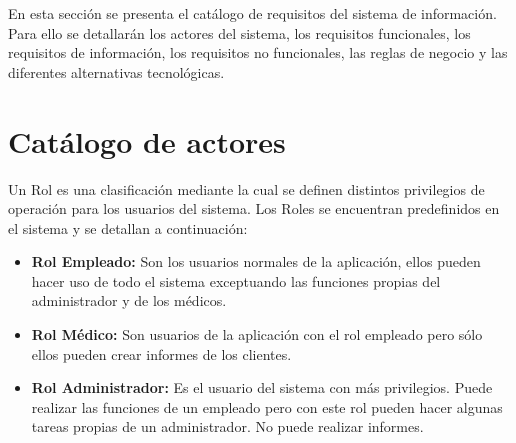 

En esta sección se presenta el catálogo de requisitos del sistema de información. Para ello se detallarán los actores del sistema, los requisitos funcionales, los requisitos de información, los requisitos no funcionales, las reglas de negocio y las diferentes alternativas tecnológicas.
\section{Catálogo de actores}
Un Rol es una clasificación mediante la cual se definen distintos privilegios de operación para los usuarios del sistema. Los Roles se encuentran predefinidos en el sistema y se detallan a continuación:
\begin{itemize}
\item \textbf{Rol Empleado:} Son los usuarios normales de la aplicación, ellos pueden hacer uso de todo el sistema exceptuando las funciones propias del administrador y de los médicos.
\end{itemize}
\begin{itemize}
\item \textbf{Rol Médico:} Son usuarios de la aplicación con el rol empleado pero sólo ellos pueden crear informes de los clientes.
\end{itemize}
\begin{itemize}
\item \textbf{Rol Administrador:} Es el usuario del sistema con más privilegios. Puede realizar las funciones de un empleado pero con este rol pueden hacer algunas tareas propias de un administrador. No puede realizar informes.
\end{itemize}

